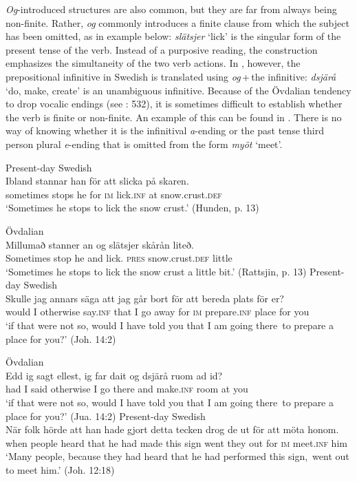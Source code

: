 \documentclass[output=paper]{langscibook}
\begin{document}
\textit{Og}-introduced structures are also common, but they are far from always being non-finite. Rather, \textit{og} commonly introduces a finite clause from which the subject has been omitted, as in example  below: \textit{slätsjer} ‘lick’ is the singular form of the present tense of the verb. Instead of a purposive reading, the construction emphasizes the simultaneity of the two verb actions. In , however, the prepositional infinitive in Swedish is translated using \textit{og}\,+\,the infinitive: \textit{dsjärå} ‘do, make, create’ is an unambiguous infinitive. Because of the Övdalian tendency to drop vocalic endings (see \citealt{AkerbergNystrom2012}: 532), it is sometimes difficult to establish whether the verb is finite or non-finite. An example of this can be found in . There is no way of knowing whether it is the infinitival \textit{a}{}-ending or the past tense third person plural \textit{e}{}-ending that is omitted from the form \textit{myöt} ‘meet’. 


\ea
\label{ex:kalm:17}
\ea Present-day Swedish\label{ex:kalm:17a}\\
\gll Ibland stannar han för att slicka på skaren.\\
sometimes stops he for \textsc{im} lick.\textsc{inf} at snow.crust.\textsc{def}\\
\glt ‘Sometimes he stops to lick the snow crust.’ (Hunden, p. 13)

\ex Övdalian\label{ex:kalm:17b}\\ 
\gll Millumað stanner an og slätsjer skårån liteð.\\
Sometimes stop he and lick. \textsc{pres} snow.crust.\textsc{def} little\\
\glt ‘Sometimes he stops to lick the snow crust a little bit.’ (Rattsjin, p. 13)
\z 
\ex
\label{ex:kalm:18}
\ea Present-day Swedish\label{ex:kalm:18a}\\
\gll Skulle jag annars säga att jag går bort för att bereda plats för er?\\
would I otherwise say.\textsc{inf} that I go away for \textsc{im} prepare.\textsc{inf} place for you\\
\glt ‘if that were not so, would I have told you that I am going there{~}to prepare a place for you?’ (Joh. 14:2)

\ex Övdalian\label{ex:kalm:18b}\\
\gll Edd ig sagt ellest, ig far dait og dsjärå ruom ad id?\\
had I said otherwise I go there and make.\textsc{inf} room at you\\
 \glt ‘if that were not so, would I have told you that I am going there{~}to prepare a place for you?’ (Jua. 14:2)
\z 
\ex
\label{ex:kalm:19}
\ea Present-day Swedish\label{ex:kalm:19a}\\
\gll När folk hörde att han hade gjort detta tecken drog de ut för att möta honom.\\
when people heard that he had made this sign went they out for \textsc{im} meet.\textsc{inf} him\\
\glt ‘Many people, because they had heard that he had performed this sign,{~}went out to meet him.’ (Joh. 12:18)
\end{document}
